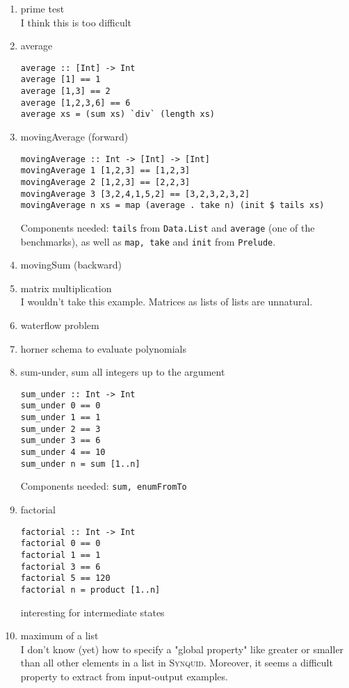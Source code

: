 \begin{enumerate}
	\item prime test \\
	I think this is too difficult
	\item average
	\begin{lstlisting}
average :: [Int] -> Int
average [1] == 1
average [1,3] == 2
average [1,2,3,6] == 6
average xs = (sum xs) `div` (length xs)
	\end{lstlisting}
	\item movingAverage (forward)
	\begin{lstlisting}
movingAverage :: Int -> [Int] -> [Int]
movingAverage 1 [1,2,3] == [1,2,3]
movingAverage 2 [1,2,3] == [2,2,3]
movingAverage 3 [3,2,4,1,5,2] == [3,2,3,2,3,2]
movingAverage n xs = map (average . take n) (init $ tails xs)
	\end{lstlisting}
	Components needed: \lstinline?tails? from \lstinline?Data.List? and  \lstinline?average? (one of the benchmarks), as well as \lstinline?map, take? and \lstinline?init? from \lstinline?Prelude?.
	\item movingSum (backward)
	\item matrix multiplication \\
	I wouldn't take this example. Matrices as lists of lists are unnatural.
	\item waterflow problem
	\item horner schema to evaluate polynomials
	\item sum-under, sum all integers up to the argument
	\begin{lstlisting}
sum_under :: Int -> Int
sum_under 0 == 0
sum_under 1 == 1
sum_under 2 == 3
sum_under 3 == 6
sum_under 4 == 10
sum_under n = sum [1..n]
	\end{lstlisting}
	Components needed: \lstinline?sum, enumFromTo?
	\item factorial \\
	\begin{lstlisting}
factorial :: Int -> Int
factorial 0 == 0
factorial 1 == 1
factorial 3 == 6
factorial 5 == 120
factorial n = product [1..n]
	\end{lstlisting}
	interesting for intermediate states
	\item maximum of a list\\
	I don't know (yet) how to specify a "global property" like greater or smaller than all other elements in a list in \textsc{Synquid}. Moreover, it seems a difficult property to extract from input-output examples.
	\begin{lstlisting}

\end{lstlisting}
\end{enumerate}
